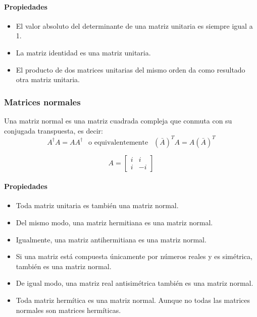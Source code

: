 \newpage

\paragraph{Propiedades}

\begin{itemize}
  \item El valor absoluto del determinante de una matriz unitaria es siempre igual a 1.
  \item La matriz identidad es una matriz unitaria.
  \item El producto de dos matrices unitarias del mismo orden da como resultado otra matriz unitaria.
\end{itemize}

\subsubsection{Matrices normales}

Una matriz normal es una matriz cuadrada compleja que conmuta con su conjugada transpuesta, es decir:
\[
  A^\dagger A = A A^\dagger ~~ \text{ o equivalentemente } ~~ (\bar{A})^T A = A (\bar{A})^T
\]

\[
  A = \begin{bmatrix}
    i & i \\ i & -i
  \end{bmatrix}
\]

\paragraph{Propiedades}

\begin{itemize}
  \item Toda matriz unitaria es también una matriz normal.
  \item Del mismo modo, una matriz hermitiana es una matriz normal.
  \item Igualmente, una matriz antihermitiana es una matriz normal.
  \item Si una matriz está compuesta únicamente por números reales y es simétrica, también es una matriz normal.
  \item De igual modo, una matriz real antisimétrica también es una matriz normal.
  \item Toda matriz hermítica es una matriz normal. Aunque no todas las matrices normales son matrices hermíticas.
\end{itemize}

